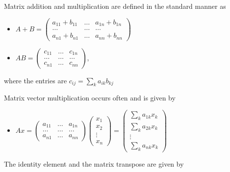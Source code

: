 Matrix addition and multiplication are defined in the standard manner as

\begin{itemize}
\tightlist
\item
  \(A+B=\left( \begin{array}{ccc}a_{11}+b_{11}&\dots&a_{1n}+b_{1n}\\ \dots & \dots & \dots \\ a_{n1}+b_{n1} & \dots & a_{nn}+b_{nn}\end{array}\right)\)
\item
  \(AB =\left( \begin{array}{ccc}c_{11}&\dots&c_{1n}\\ \dots & \dots & \dots\\ c_{n1} & \dots & c_{nn}\end{array}\right)\),
\end{itemize}

where the entries are \(c_{ij} = \sum_k a_{ik}b_{kj}\)

Matrix vector multiplication occurs often and is given by

\begin{itemize}
\tightlist
\item
  \(Ax = \left( \begin{array}{ccc}a_{11}&\dots&a_{1n}\\ \dots & \dots & \dots\\ a_{n1} & \dots & a_{nn}\end{array}\right)\left(\begin{array}{c} x_1 \\ x_2 \\ \vdots\\ x_n \end{array}\right) =   \left(\begin{array}{c} \sum_k a_{1k}x_k \\ \sum_k a_{2k}x_k \\ \vdots\\ \sum_k a_{nk}x_k \end{array}\right)\)
\end{itemize}

The identity element and the matrix transpose are given by

